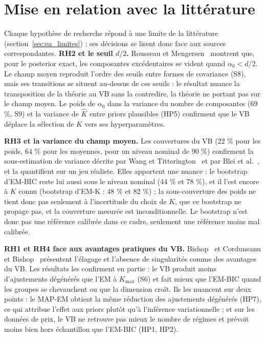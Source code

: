 \section{Mise en relation avec la littérature}\label{sec:res_litterature}
Chaque hypothèse de recherche répond à une limite de la littérature (section~\ref{sec:ea_limites}) ; ses décisions se lisent donc face aux sources correspondantes.
\textbf{RH2 et le seuil $d/2$.} Rousseau et Mengersen~\cite{rousseau2011} montrent que, pour le posterior exact, les composantes excédentaires se vident quand $\alpha_0 < d/2$. Le champ moyen reproduit l'ordre des seuils entre formes de covariance (S8), mais ses transitions se situent au-dessus de ces seuils : le résultat nuance la transposition de la théorie au VB sans la contredire, la théorie ne portant pas sur le champ moyen. Le poids de $\alpha_0$ dans la variance du nombre de composantes (69 \%, S9) et la variance de $\hat K$ entre priors plausibles (HP5) confirment que le VB déplace la sélection de $K$ vers ses hyperparamètres.

\textbf{RH3 et la variance du champ moyen.} Les couvertures du VB (22 \% pour les poids, 64 \% pour les moyennes, pour un niveau nominal de 90 \%) confirment la sous-estimation de variance décrite par Wang et Titterington~\cite{wang2005} et par Blei et al.~\cite{blei2017}, et la quantifient sur un jeu réaliste. Elles apportent une nuance : le bootstrap d'EM-BIC reste lui aussi sous le niveau nominal (44 \% et 78 \%), et il l'est encore à $K$ connu (bootstrap d'EM-K : 48 \% et 82 \%) ; la sous-couverture des poids ne tient donc pas seulement à l'incertitude du choix de $K$, que ce bootstrap ne propage pas, et la couverture mesurée est inconditionnelle. Le bootstrap n'est donc pas une référence calibrée dans ce cadre, seulement une référence moins mal calibrée.

\textbf{RH1 et RH4 face aux avantages pratiques du VB.} Bishop~\cite{bishop2006} et Corduneanu et Bishop~\cite{corduneanu2001} présentent l'élagage et l'absence de singularités comme des avantages du VB. Les résultats les confirment en partie : le VB produit moins d'ajustements dégénérés que l'EM à $K_{\max}$ (S6) et fait mieux que l'EM-BIC quand les groupes se chevauchent ou que la dimension croît. Ils les nuancent sur deux points : le MAP-EM obtient la même réduction des ajustements dégénérés (HP7), ce qui attribue l'effet aux priors plutôt qu'à l'inférence variationnelle ; et sur les données de prix, le VB ne retrouve pas mieux le nombre de régimes et prévoit moins bien hors échantillon que l'EM-BIC (HP1, HP2).

